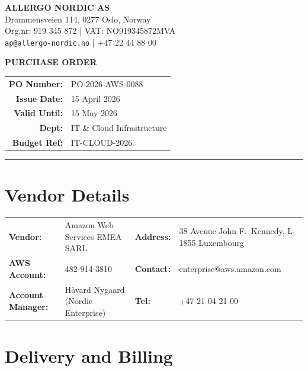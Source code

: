 \documentclass[a4paper,11pt]{article}
\begin{document}
\noindent
\begin{minipage}[t]{0.52\textwidth}
  {\color{brand}\LARGE\bfseries ALLERGO NORDIC AS}\\[4pt]
  Drammensveien 114, 0277 Oslo, Norway\\
  Org.nr: 919 345 872 | VAT: NO919345872MVA\\
  \texttt{ap@allergo-nordic.no} | +47 22 44 88 00
\end{minipage}
\hfill
\begin{minipage}[t]{0.42\textwidth}
  \raggedleft
  \colorbox{brand}{\color{white}\bfseries\Large\quad PURCHASE ORDER \quad}\\[8pt]
  \begin{tabular}{rl}
    \textbf{PO Number:}    & PO-2026-AWS-0088 \\
    \textbf{Issue Date:}   & 15 April 2026 \\
    \textbf{Valid Until:}  & 15 May 2026 \\
    \textbf{Dept:}         & IT \& Cloud Infrastructure \\
    \textbf{Budget Ref:}   & IT-CLOUD-2026 \\
  \end{tabular}
\end{minipage}

\vspace{12pt}
\noindent\rule{\textwidth}{1.5pt}
\vspace{8pt}

\section{Vendor Details}

\begin{tabularx}{\textwidth}{lX lX}
  \textbf{Vendor:}    & Amazon Web Services EMEA SARL &
  \textbf{Address:}   & 38 Avenue John F.\ Kennedy, L-1855 Luxembourg \\
  \textbf{AWS Account:} & 482-914-3810 &
  \textbf{Contact:}   & enterprise@aws.amazon.com \\
  \textbf{Account Manager:} & Håvard Nygaard (Nordic Enterprise) &
  \textbf{Tel:}       & +47 21 04 21 00 \\
\end{tabularx}

\section{Delivery and Billing}
\end{document}

